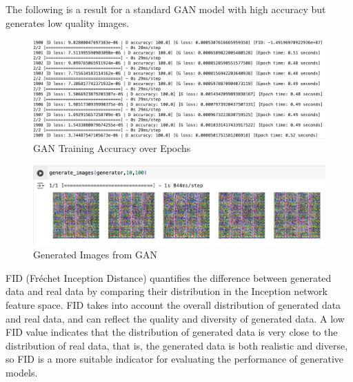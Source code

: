 The following is a result for a standard GAN model with high accuracy but generates low quality images.

\begin{figure}[H]
    \centering
    \includegraphics[width=1.2\linewidth]{./Images/model_accuracy.jpg}
    \caption{GAN Training Accuracy over Epochs}
    \label{fig:my_picture}
\end{figure}

\begin{figure}[H]
    \centering
    \includegraphics[width=1.2\linewidth]{./Images/generate_images.jpg}
    \caption{Generated Images from GAN}
    \label{fig:my_picture}
\end{figure}

FID (Fréchet Inception Distance) quantifies the difference between generated data and real 
data by comparing their distribution in the Inception network feature space. FID takes into 
account the overall distribution of generated data and real data, and can reflect the quality 
and diversity of generated data. A low FID value indicates that the distribution of generated 
data is very close to the distribution of real data, that is, the generated data is both realistic 
and diverse, so FID is a more suitable indicator for evaluating the performance of generative models.